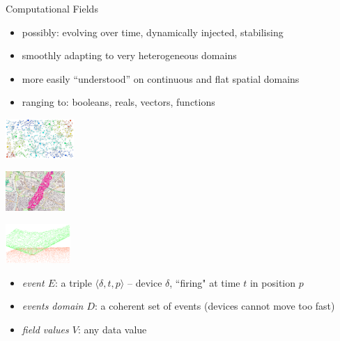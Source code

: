 \documentclass[8pt, aspectratio=169, handout]{beamer}
\begin{document}
\begin{frame}[allowframebreaks]{Computational Fields}
  \begin{card}
    \begin{itemize}
      \item possibly: evolving over time, dynamically injected, stabilising
      \item smoothly adapting to very heterogeneous domains
      \item more easily ``understood'' on continuous and flat spatial domains
      \item ranging to: booleans, reals, vectors, functions
    \end{itemize}
    
  \end{card}
  \centering
  \begin{multicols}{3}
    \begin{card}
      \centering
      \includegraphics[height=15mm]{img/scr-result.png}
    \end{card}
    \begin{card}
      \centering
      \includegraphics[height=15mm]{img/channel.png}
    \end{card}
    \begin{card}
      \centering
      \includegraphics[height=15mm]{img/3d-gradient.png}
    \end{card}
  \end{multicols}
  \begin{card}
    \begin{itemize}
      \item \emph{event $E$}: a triple $\langle\delta, t, p\rangle$ – device $\delta$, ``firing" at time $t$ in position $p$
      \item \emph{events domain $D$}: a coherent set of events (devices cannot move too fast)
      \item \emph{field values $V$}: any data value
    \end{itemize}
  \end{card}
  \centering
  \begin{multicols}{2}
  \end{multicols}
\end{frame}
\end{document}

